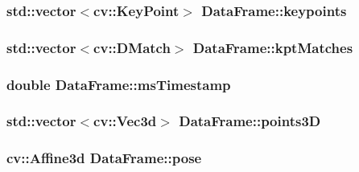 \subsubsection[{\texorpdfstring{keypoints}{keypoints}}]{\setlength{\rightskip}{0pt plus 5cm}std\+::vector$<$cv\+::\+Key\+Point$>$ Data\+Frame\+::keypoints}\hypertarget{structDataFrame_a88fb91bb47cdddd284f2587517856592}{}\label{structDataFrame_a88fb91bb47cdddd284f2587517856592}
\subsubsection[{\texorpdfstring{kpt\+Matches}{kptMatches}}]{\setlength{\rightskip}{0pt plus 5cm}std\+::vector$<$cv\+::\+D\+Match$>$ Data\+Frame\+::kpt\+Matches}\hypertarget{structDataFrame_af551ce74f7dbaa40295c6903c7732dcb}{}\label{structDataFrame_af551ce74f7dbaa40295c6903c7732dcb}
\subsubsection[{\texorpdfstring{ms\+Timestamp}{msTimestamp}}]{\setlength{\rightskip}{0pt plus 5cm}double Data\+Frame\+::ms\+Timestamp}\hypertarget{structDataFrame_a25ec037466975cee2072b0922effc7f8}{}\label{structDataFrame_a25ec037466975cee2072b0922effc7f8}
\subsubsection[{\texorpdfstring{points3D}{points3D}}]{\setlength{\rightskip}{0pt plus 5cm}std\+::vector$<$cv\+::\+Vec3d$>$ Data\+Frame\+::points3D}\hypertarget{structDataFrame_a1f7311869470a28ac444a9a502b8e5bf}{}\label{structDataFrame_a1f7311869470a28ac444a9a502b8e5bf}
\subsubsection[{\texorpdfstring{pose}{pose}}]{\setlength{\rightskip}{0pt plus 5cm}cv\+::\+Affine3d Data\+Frame\+::pose}\hypertarget{structDataFrame_a6928232a02166e60d50ef4d551b57d01}{}\label{structDataFrame_a6928232a02166e60d50ef4d551b57d01}
